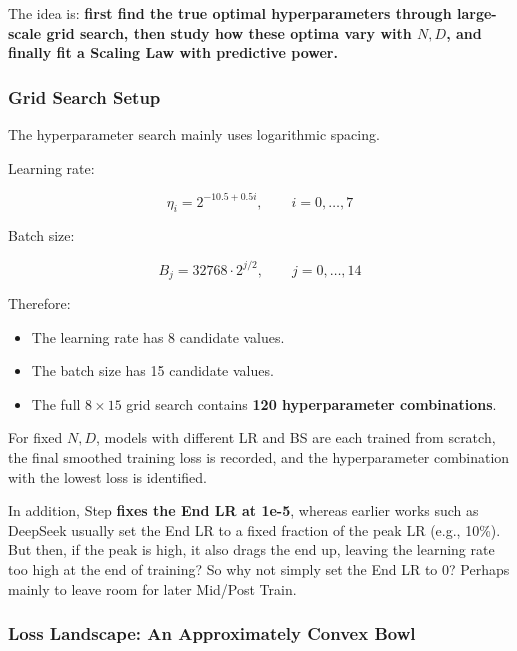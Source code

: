 \documentclass[
  english,
  11pt,
  a4paper,
]{article}
\providecommand{\tightlist}{%
  \setlength{\itemsep}{0pt}\setlength{\parskip}{0pt}}
\newenvironment{NotesFormula}{%
  \par\noindent\begin{minipage}{\linewidth}%
  \setlength{\parindent}{2em}%
  \setlength{\parskip}{0.35em}%
}{\end{minipage}\par}
\begin{document}
The idea is: \textbf{first find the true optimal hyperparameters through
large-scale grid search, then study how these optima vary with \(N,D\),
and finally fit a Scaling Law with predictive power.}

\subsubsection{Grid Search Setup}\label{grid-search-setup}

The hyperparameter search mainly uses logarithmic spacing.

\begin{NotesFormula}

Learning rate:

\[\eta_i=2^{-10.5+0.5i},\qquad i=0,\ldots,7\]

\end{NotesFormula}

\begin{NotesFormula}

Batch size:

\[B_j=32768\cdot2^{j/2},\qquad j=0,\ldots,14\]

\end{NotesFormula}

Therefore:

\begin{itemize}
\tightlist
\item
  The learning rate has 8 candidate values.
\item
  The batch size has 15 candidate values.
\item
  The full \(8\times15\) grid search contains \textbf{120 hyperparameter
  combinations}.
\end{itemize}

For fixed \(N,D\), models with different LR and BS are each trained from
scratch, the final smoothed training loss is recorded, and the
hyperparameter combination with the lowest loss is identified.

In addition, Step \textbf{fixes the End LR at 1e-5}, whereas earlier
works such as DeepSeek usually set the End LR to a fixed fraction of the
peak LR (e.g., 10\%). But then, if the peak is high, it also drags the
end up, leaving the learning rate too high at the end of training? So
why not simply set the End LR to 0? Perhaps mainly to leave room for
later Mid/Post Train.

\subsubsection{Loss Landscape: An Approximately Convex
Bowl}\label{loss-landscape-an-approximately-convex-bowl}
\end{document}
